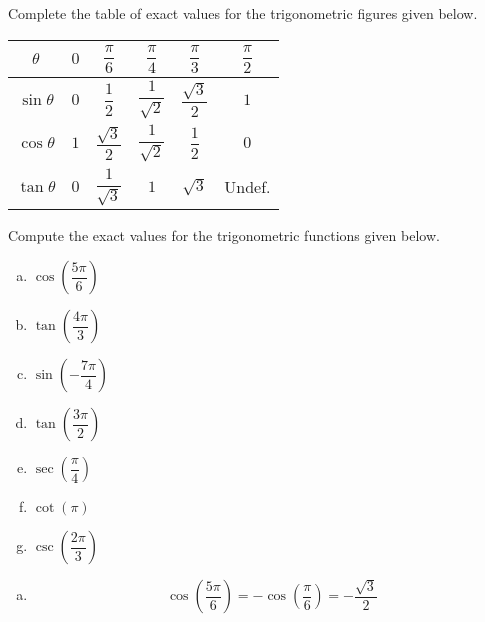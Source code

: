 \documentclass[12pt,letterpaper]{exam}
\begin{document}
\examtitle
{} 
\scores
\newpage

\begin{questions}

\newpage
\question[15] Complete the table of exact values for the trigonometric figures given below.
	{\def\arraystretch{3}
	\setlength{\tabcolsep}{2.5em}
	\begin{table}[!ht]
	\centering
	\begin{tabular}{|c||c|c|c|c|c|} \hline
	$\theta$ & $0$ & $\dfrac{\pi}{6}$ & $\dfrac{\pi}{4}$ & $\dfrac{\pi}{3}$ & $\dfrac{\pi}{2}$ \\ \hline \hline
	$\sin \theta$ & $0$ & $\dfrac{1}{2}$ & $\dfrac{1}{\sqrt{2}}$ & $\dfrac{\sqrt{3}}{2}$ & $1$ \\ \hline
	$\cos \theta$ & $1$ & $\dfrac{\sqrt{3}}{2}$ & $\dfrac{1}{\sqrt{2}}$ & $\dfrac{1}{2}$ & $0$ \\ \hline
	$\tan \theta$ & $0$ & $\dfrac{1}{\sqrt{3}}$ & $1$ & $\sqrt{3}$ & Undef. \\ \hline
	\end{tabular}
	\end{table}
	}



\newpage
\question[15] Compute the exact values for the trigonometric functions given below.
	\begin{enumerate}[(a)]
	\item $\cos \!\left( \dfrac{5\pi}{6} \right)$
	\item $\tan \!\left( \dfrac{4\pi}{3} \right)$
	\item $\sin \!\left( -\dfrac{7\pi}{4} \right)$
	\item $\tan \!\left( \dfrac{3\pi}{2} \right)$
	\item $\sec \!\left( \dfrac{\pi}{4} \right)$
	\item $\cot \left( \pi \right)$
	\item $\csc \!\left( \dfrac{2\pi}{3} \right)$
	\end{enumerate} \pspace

{\itshape \sol
\begin{enumerate}[(a)]
\item 
	\[
	\cos \!\left( \dfrac{5\pi}{6} \right)= -\cos \!\left( \dfrac{\pi}{6} \right)= -\dfrac{\sqrt{3}}{2}
	\]


\end{enumerate}}
\end{questions}
\end{document}
